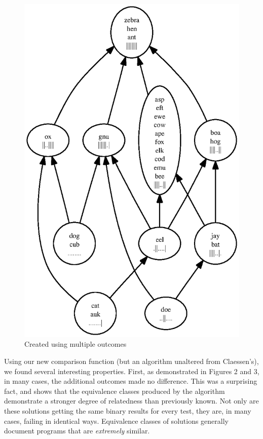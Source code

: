 \documentclass[11pt,twoside]{article}
\theoremstyle{definition}
\begin{document}
\begin{figure}
\includegraphics[scale=0.75]{rank2.ps}
\caption{Created using multiple outcomes}
\end{figure}

Using our new comparison function (but an algorithm unaltered from Claessen's), we found several interesting properties. First, as demonstrated in Figures 2 and 3, in many cases, the additional outcomes made no difference. This was a surprising fact, and shows that the equivalence classes produced by the algorithm demonstrate a stronger degree of relatedness than previously known. Not only are these solutions getting the same binary results for every test, they are, in many cases, failing in  identical ways. Equivalence classes of solutions generally document programs that are \emph{extremely} similar.
\end{document}

